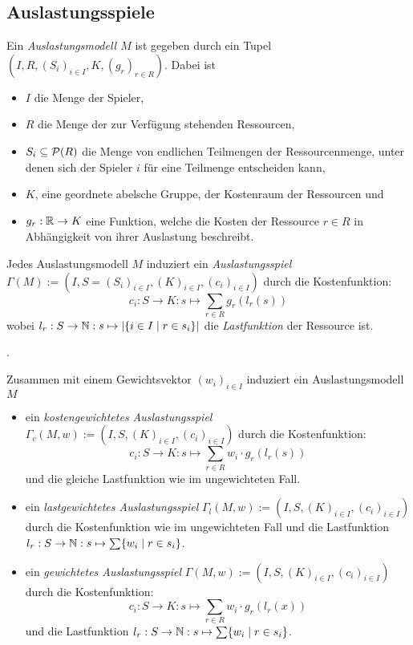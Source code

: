 \subsection{Auslastungsspiele}

\begin{defn}\label{def:Auslastungsmodel}
	Ein \emph{Auslastungsmodell $M$} ist gegeben durch ein Tupel $(I, R, (S_i)_{i\in I}, K, (g_r)_{r \in R})$. Dabei ist
	\begin{itemize}
		\item $I$ die Menge der Spieler,
		\item $R$ die Menge der zur Verfügung stehenden Ressourcen,
		\item $S_i \subseteq \mathcal{P}(R)$ die Menge von endlichen Teilmengen der Ressourcenmenge, unter denen sich der Spieler $i$ für eine Teilmenge entscheiden kann,
		\item $K$, eine geordnete abelsche Gruppe, der Kostenraum der Ressourcen und
		\item $g_r: \mathbb{R} \to K$ eine Funktion, welche die Kosten der Ressource $r \in R$ in Abhängigkeit von ihrer Auslastung beschreibt.
	\end{itemize}
\end{defn}

\begin{defn}\label{def:Auslastungsspiel}
	Jedes Auslastungsmodell $M$ induziert ein \emph{Auslastungsspiel} $\Gamma(M) := (I, S = (S_i)_{i\in I}, (K)_{i\in I}, (c_i)_{i \in I})$ durch die Kostenfunktion:
	\[c_i: S \to K: s \mapsto \sum_{r \in R} g_r(l_r(s)) \]
	wobei $l_r: S \to \mathbb{N}: s \mapsto \left|\{i\in I \mid r \in s_i\}\right|$ die \emph{Lastfunktion} der Ressource ist.
\end{defn}

\begin{bsp}.
	
\end{bsp}

\begin{defn}\label{def:gewAuslastungsspiel}
	Zusammen mit einem Gewichtsvektor $(w_i)_{i\in I}$ induziert ein Auslastungsmodell $M$ 
	\begin{itemize}
		\item ein \emph{kostengewichtetes Auslastungsspiel} $\Gamma_c(M, w) := (I, S, (K)_{i\in I}, (c_i)_{i \in I})$ durch die Kostenfunktion:
		\[c_i: S \to K: s \mapsto \sum_{r \in R} w_i\cdot g_r(l_r(s)) \]
		und die gleiche Lastfunktion wie im ungewichteten Fall.
		\item ein \emph{lastgewichtetes Auslastungsspiel} $\Gamma_l(M, w) := (I, S, (K)_{i\in I}, (c_i)_{i \in I})$ durch die Kostenfunktion wie im ungewichteten Fall und die Lastfunktion $l_r: S \to \mathbb{N}: s \mapsto \sum\{w_i \mid r \in s_i\}$.
		\item ein \emph{gewichtetes Auslastungsspiel} $\Gamma(M, w) := (I, S, (K)_{i\in I}, (c_i)_{i \in I})$ durch die Kostenfunktion:
		\[c_i: S \to K: s \mapsto \sum_{r \in R} w_i\cdot g_r(l_r(x)) \]
		und die Lastfunktion $l_r: S \to \mathbb{N}: s \mapsto \sum\{w_i \mid r \in s_i\}$.
	\end{itemize}	
\end{defn}

